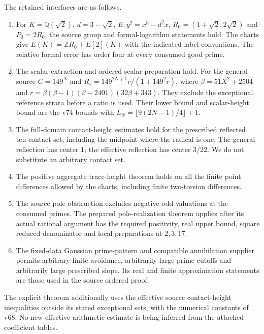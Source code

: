 \documentclass[11pt]{article}
\theoremstyle{remark}\newtheorem{remark}[theorem]{Remark}
\newcommand{\Q}{\mathbb Q}\newcommand{\Z}{\mathbb Z}
\begin{document}
The retained interfaces are as follows.
\begin{enumerate}
\item For $K=\Q(\sqrt2)$, $d=3-\sqrt2$, $E:y^2=x^3-d^2x$,
$R_0=(1+\sqrt2,2\sqrt2)$ and $P_0=2R_0$, the source group
and formal-logarithm statements hold. The charts give
$E(K)=\Z R_0+E[2](K)$ with the indicated label conventions.
The relative formal error has order four at every consumed good prime.
\item The scalar extraction and ordered scalar preparation hold.
For the general source $C=149^N$ and
$R_s=149^{2N+1}r/(1+149^2r)$, where
$\beta=51X^2+2504$ and
$r=\beta(\beta-1)(\beta-2401)(32\beta+343)$.
They exclude the exceptional reference strata before a ratio is used.
Their lower bound and scalar-height bound are the v74 bounds with
$L_N=\lfloor9(2N-1)/4\rfloor+1$.
\item The full-domain contact-height estimates hold for the prescribed
reflected ten-contact set, including the midpoint where the radical is
one. The general reflection has center $1$; the effective reflection
has center $3/22$. We do not substitute an arbitrary contact set.
\item The positive aggregate trace-height theorem holds on all the
finite point differences allowed by the charts, including finite
two-torsion differences.
\item The source pole obstruction excludes negative odd valuations
at the consumed primes. The prepared pole-realization theorem applies
after its actual rational argument has the required positivity, real
upper bound, square reduced denominator and local preparations at
$2,3,17$.
\item The fixed-data Gaussian prime-pattern and compatible annihilation
supplier permits arbitrary finite avoidance, arbitrarily large prime
cutoffs and arbitrarily large prescribed slope. Its real and finite
approximation statements are those used in the source ordered proof.
\end{enumerate}
The explicit theorem additionally uses the effective source
contact-height inequalities outside its stated exceptional sets, with
the numerical constants of v68. No new effective arithmetic estimate
is being inferred from the attached coefficient tables.
\end{document}
